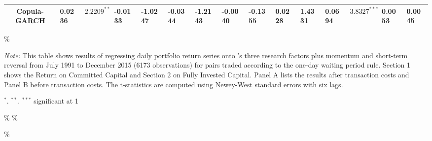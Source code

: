 \documentclass[a4paper]{article}
\begin{document}
\begin{sidewaystable}
\begin{threeparttable}[H]
\begin{tabularx}{\textwidth}{@{\extracolsep{\fill}}lllllllllllllll@{}}
			\multicolumn{1}{c}{Copula-GARCH} & 0.0236 & $2.2209^{**}$ & -0.0133 & -1.0247 & -0.0344 & -1.2143 & -0.0040 & -0.1355 & 0.0228 & 1.4331 & 0.0694 & $3.8327^{***}$ & 0.0053 & 0.0045  \\
			\bottomrule
		\end{tabularx}\%
		\begin{tablenotes}
			\item \textit{Note:} \scriptsize  This table shows results of regressing daily portfolio return series onto \citet*{ff93}'s three research factors plus momentum and short-term reversal from July 1991 to December 2015 (6173 observations) for pairs traded according to the one-day waiting period rule. Section 1 shows the Return on Committed Capital and Section 2 on Fully Invested Capital. Panel A lists the results after transaction costs and Panel B before transaction costs. The t-statistics are computed using Newey-West standard errors with six lags.
			\item \scriptsize $^{\ast}$. $^{\ast\ast}$. $^{\ast\ast\ast}$  significant at 1\\%
		\end{tablenotes}
	\end{threeparttable}\%
	\label{tab:table116}\%
\end{sidewaystable}\%
\end{document}
